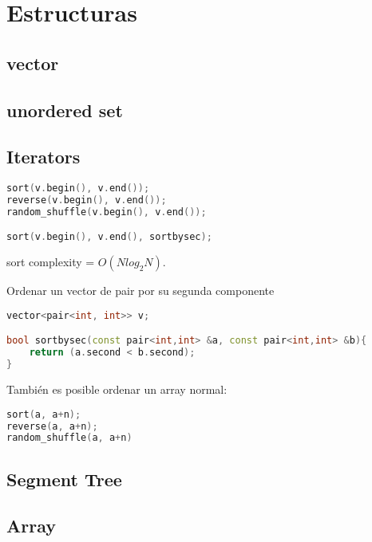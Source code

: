 \newpage
\section{Estructuras}

\subsection{vector}


\subsection{unordered set}


\subsection{Iterators}
\begin{lstlisting}[language=C++]
sort(v.begin(), v.end());
reverse(v.begin(), v.end());
random_shuffle(v.begin(), v.end());

sort(v.begin(), v.end(), sortbysec);
\end{lstlisting}

sort complexity = $O(N log_2 N)$.

Ordenar un vector de pair por su segunda componente
\begin{lstlisting}[language=C++]
vector<pair<int, int>> v;

bool sortbysec(const pair<int,int> &a, const pair<int,int> &b){
	return (a.second < b.second);
}
\end{lstlisting}

También es posible ordenar un array normal:
\begin{lstlisting}[language=C++]
sort(a, a+n);
reverse(a, a+n);
random_shuffle(a, a+n)
\end{lstlisting}

\subsection{Segment Tree}


\subsection{Array}

\newpage
